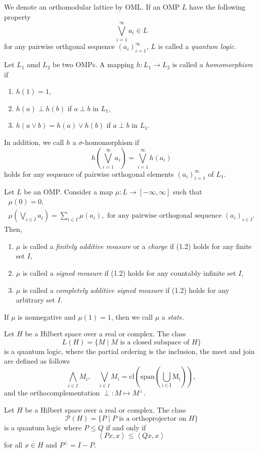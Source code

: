 We denote an orthomodular lattice by OML. If an OMP \(L\) have the following property
\[\bigvee_{i=1}^\infty a_i \in L\]
for any pairwise orthgonal sequence \((a_i)_{i=1}^{\infty}\),
\(L\) is called a \emph{quantum logic}.
\begin{definition}
    Let \(L_1\) amd \(L_2\) be two OMPs. A mapping \(h:L_1 \to L_2\) is called a \emph{homomorphism} if
    \begin{enumerate}
        \item \(h(1)=1\),
        \item \(h(a)\perp h(b)\) if \(a\perp b\) in \(L_1\),
        \item \(h(a\vee b)=h(a)\vee h(b)\) if \(a\perp b\) in \(L_1\).
    \end{enumerate}
    In addition, we call \(h\) a \(\sigma\)-homomorphism if
    \[h(\bigvee_{i=1}^{\infty} a_i) = \bigvee_{i=1}^{\infty} h(a_i)\]
    holds for any sequence of pairwise orthogonal elements \((a_i)_{i=1}^{\infty}\) of \(L_1\).
\end{definition}
\begin{definition}
    Let \(L\) be an OMP. Consider a map \(\mu:L\to [-\infty,\infty]\) such that
    \begin{gather}
        \mu(0)=0,\\
        \mu(\bigvee_{i \in I} a_i) = \sum_{i \in I} \mu(a_i), \mbox{ for any pairwise orthogonal sequence } (a_i)_{i \in I}.
    \end{gather}
    Then,
    \begin{enumerate}
        \item \(\mu\) is called a \emph{finitely additive measure} or a \emph{charge} if (1.2) holds for any finite set \(I\),
        \item \(\mu\) is called a \emph{signed measure} if (1.2) holds for any countably infinite set \(I\),
        \item \(\mu\) is called a \emph{completely additive signed measure} if (1.2) holds for any arbitrary set \(I\).
    \end{enumerate}
If \(\mu\) is nonnegative and \(\mu(1)=1\), then we call \(\mu\) a \emph{state}.
\end{definition}

\begin{example}
    Let \(H\) be a Hilbert space over a real or complex. The class
    \[L(H)=\{M \mid M \mbox{ is a closed subspace of } H\}\]
    is a quantum logic, where the partial ordering is the inclusion, the meet and join are defined as follows
    \[\bigwedge_{i \in I} M_i, \quad \bigvee_{i \in I} M_i = \mathrm{cl}(\mathrm{span(\bigcup_{i\in I} M_i)}),\]
    and the orthocomplementation \(\perp:M \mapsto M^\perp\).
\end{example}

\begin{example}
    Let \(H\) be a Hilbert space over a real or complex. The class
    \[\mathcal{P}(H)=\{P \mid P \mbox{ is a orthoprojector on } H\}\]
    is a quantum logic where \(P\le Q\) if and only if \[\left \langle Px,x \right \rangle \le \left \langle Qx,x \right \rangle\]
    for all \(x \in H\) and \(P^\perp=I-P\).
\end{example}